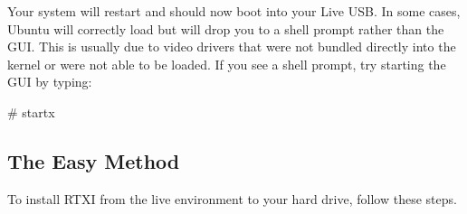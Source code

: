 \begin{enumerate}
Your system will restart and should now boot into your Live USB. In some cases, Ubuntu will correctly load but will drop you to a shell prompt rather than the GUI. This is usually due to video drivers that were not bundled directly into the kernel or were not able to be loaded. If you see a shell prompt, try starting the GUI by typing:

\begin{example}
\# startx
\end{example}
\end{enumerate}

\subsection{The Easy Method}

To install RTXI from the live environment to your hard drive, follow these steps. 

